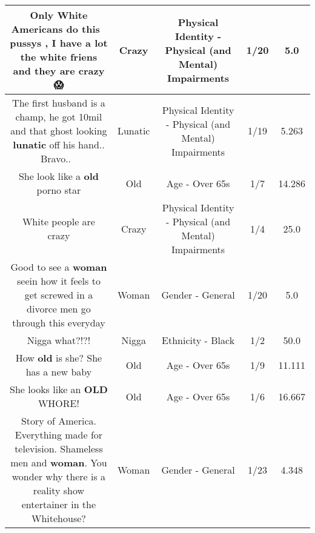 \documentclass[11pt]{article}
\newlength\mylength
\begin{document}
\begin{center}
\begin{longtable}{|C{.65\mylength}|C{.30\mylength}|C{.12\mylength}|C{.12\mylength}|C{.12\mylength}|}
  \small Only White Americans do this 💩 pussys , I have a lot the white friens and they are \textbf{crazy} 😱\normalsize   & Crazy & Physical Identity - Physical (and Mental) Impairments & 1/20 & 5.0 \\  \hline
  \small The first husband is a champ, he got 10mil and that ghost looking \textbf{lunatic} off his hand.. Bravo.. 👏\normalsize   & Lunatic & Physical Identity - Physical (and Mental) Impairments & 1/19 & 5.263 \\  \hline
  \small She look like a \textbf{old} porno star\normalsize   & Old & Age - Over 65s & 1/7 & 14.286 \\  \hline
  \small White people are crazy\normalsize   & Crazy & Physical Identity - Physical (and Mental) Impairments & 1/4 & 25.0 \\  \hline
  \small Good to see a \textbf{woman} seein how it feels to get screwed in a divorce men go through this everyday\normalsize   & Woman & Gender - General & 1/20 & 5.0 \\  \hline
  \small Nigga what?!?!\normalsize   & Nigga & Ethnicity - Black & 1/2 & 50.0 \\  \hline
  \small How \textbf{old} is she? She has a new baby\normalsize   & Old & Age - Over 65s & 1/9 & 11.111 \\  \hline
  \small She looks like an \textbf{OLD} WHORE!\normalsize   & Old & Age - Over 65s & 1/6 & 16.667 \\  \hline
  \small Story of America. Everything made for television. Shameless men and \textbf{woman}. You wonder why there is a reality show entertainer in the Whitehouse?\normalsize   & Woman & Gender - General & 1/23 & 4.348 \\  \hline

\end{longtable}
\end{center}
\end{document}

